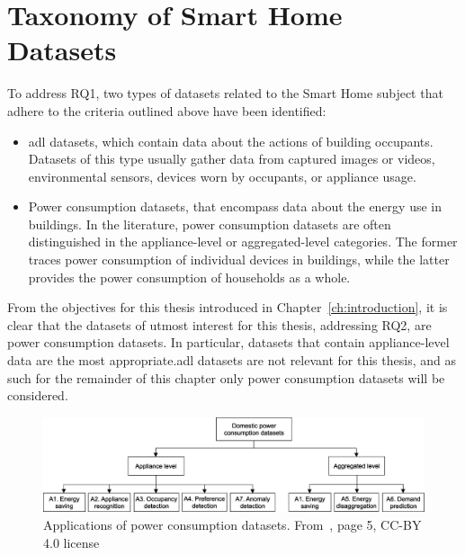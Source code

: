 \newpage

\section{Taxonomy of Smart Home Datasets}

To address RQ1, two types of datasets related to the Smart Home subject that adhere to the criteria outlined above have been identified:
\begin{itemize}
    \item \acrfull{adl} datasets, which contain data about the actions of building occupants. Datasets of this type usually gather data from captured images or videos, environmental sensors, devices worn by occupants, or appliance usage.
    \item Power consumption datasets, that encompass data about the energy use in buildings. In the literature, power consumption datasets are often distinguished in the appliance-level or aggregated-level categories. The former traces power consumption of individual devices in buildings, while the latter provides the power consumption of households as a whole.
\end{itemize}
From the objectives for this thesis introduced in Chapter~\ref{ch:introduction}, it is clear that the datasets of utmost interest for this thesis, addressing RQ2, are power consumption datasets. In particular, datasets that contain appliance-level data are the most appropriate.\@ \acrshort{adl} datasets are not relevant for this thesis, and as such for the remainder of this chapter only power consumption datasets will be considered.

\begin{figure}
    \centering
    \includegraphics[width=.9\textwidth]{images/taxonomy_power_consumption.jpg}
    \caption[Applications of power consumption datasets]{Applications of power consumption datasets. From~\textcite{himeurBuildingPowerConsumption2020}, page 5, CC-BY 4.0 license}%
    \label{fig:applications_power_consumption_datasets}
\end{figure}

